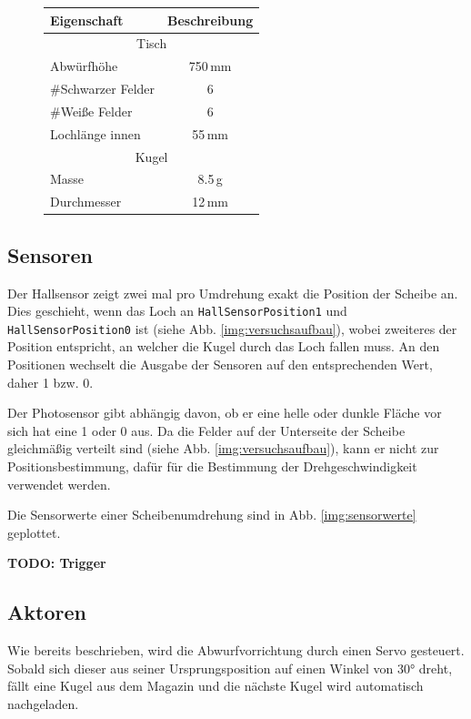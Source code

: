 \begin{figure}[h] \centering
\begin{tabular}{lc} 
	\textbf{Eigenschaft} 	& \textbf{Beschreibung}	\\
	\toprule
	\multicolumn{2}{c}{Tisch}\\ 
	\midrule
	Abwürfhöhe 	& 750\,mm \\
	\#Schwarzer Felder 	& 6 \\
	\#Weiße Felder 	& 6 \\
	Lochlänge innen 	& 55\,mm \\
	\midrule 
	\multicolumn{2}{c}{Kugel}\\ 
	\midrule
	Masse 	& 8.5\,g \\
	Durchmesser 	& 12\,mm \\
	\bottomrule
\end{tabular}
\end{figure}

\subsection{Sensoren}
Der Hallsensor zeigt zwei mal pro Umdrehung exakt die Position der Scheibe an.
Dies geschieht, wenn das Loch an \texttt{HallSensorPosition1} und \texttt{HallSensorPosition0} ist (siehe Abb. \ref{img:versuchsaufbau}), wobei zweiteres der Position entspricht, an welcher die Kugel durch das Loch fallen muss.
An den Positionen wechselt die Ausgabe der Sensoren auf den entsprechenden Wert, daher 1 bzw. 0.

Der Photosensor gibt abhängig davon, ob er eine helle oder dunkle Fläche vor sich hat eine 1 oder 0 aus.
Da die Felder auf der Unterseite der Scheibe gleichmäßig verteilt sind (siehe Abb. \ref{img:versuchsaufbau}), kann er nicht zur Positionsbestimmung, dafür für die Bestimmung der Drehgeschwindigkeit verwendet werden.

Die Sensorwerte einer Scheibenumdrehung sind in Abb. \ref{img:sensorwerte} geplottet.

\textbf{TODO: Trigger}

\subsection{Aktoren}
\label{subs:aktoren}
Wie bereits beschrieben, wird die Abwurfvorrichtung durch einen Servo gesteuert.
Sobald sich dieser aus seiner Ursprungsposition auf einen Winkel von 30° dreht, fällt eine Kugel aus dem Magazin und die nächste Kugel wird automatisch nachgeladen.

